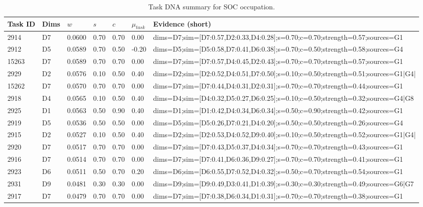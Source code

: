 \begin{table}[htbp]
\centering
\caption{Task DNA summary for SOC occupation.}
\label{tab:appendix_taskdna}
\begin{tabular}{@{}lllllll@{}}
\toprule
Task ID & Dims & $w$ & $s$ & $c$ & $\mu_{task}$ & Evidence (short) \\
\midrule
2914 & D7 & 0.0600 & 0.70 & 0.70 & 0.00 & dims=D7;sim=[D7:0.57,D2:0.33,D4:0.28];s=0.70;c=0.70;strength=0.57;sources=G1 \\
2912 & D5 & 0.0589 & 0.70 & 0.50 & -0.20 & dims=D5;sim=[D5:0.58,D7:0.41,D6:0.38];s=0.70;c=0.50;strength=0.58;sources=G4 \\
15263 & D7 & 0.0589 & 0.70 & 0.70 & 0.00 & dims=D7;sim=[D7:0.57,D4:0.45,D2:0.43];s=0.70;c=0.70;strength=0.57;sources=G1 \\
2929 & D2 & 0.0576 & 0.10 & 0.50 & 0.40 & dims=D2;sim=[D2:0.52,D4:0.51,D7:0.50];s=0.10;c=0.50;strength=0.51;sources=G1|G4| \\
15262 & D7 & 0.0570 & 0.70 & 0.70 & 0.00 & dims=D7;sim=[D7:0.44,D4:0.31,D2:0.31];s=0.70;c=0.70;strength=0.44;sources=G1 \\
2918 & D4 & 0.0565 & 0.10 & 0.50 & 0.40 & dims=D4;sim=[D4:0.32,D5:0.27,D6:0.25];s=0.10;c=0.50;strength=0.32;sources=G4|G8 \\
2925 & D1 & 0.0563 & 0.50 & 0.90 & 0.40 & dims=D1;sim=[D1:0.42,D4:0.34,D6:0.34];s=0.50;c=0.90;strength=0.42;sources=G1 \\
2919 & D5 & 0.0536 & 0.50 & 0.50 & 0.00 & dims=D5;sim=[D5:0.26,D7:0.21,D4:0.20];s=0.50;c=0.50;strength=0.26;sources=G4 \\
2915 & D2 & 0.0527 & 0.10 & 0.50 & 0.40 & dims=D2;sim=[D2:0.53,D4:0.52,D9:0.40];s=0.10;c=0.50;strength=0.52;sources=G1|G4| \\
2920 & D7 & 0.0517 & 0.70 & 0.70 & 0.00 & dims=D7;sim=[D7:0.43,D5:0.37,D4:0.34];s=0.70;c=0.70;strength=0.43;sources=G1 \\
2916 & D7 & 0.0514 & 0.70 & 0.70 & 0.00 & dims=D7;sim=[D7:0.41,D6:0.36,D9:0.27];s=0.70;c=0.70;strength=0.41;sources=G1 \\
2923 & D6 & 0.0511 & 0.50 & 0.70 & 0.20 & dims=D6;sim=[D6:0.55,D7:0.52,D4:0.32];s=0.50;c=0.70;strength=0.54;sources=G1 \\
2931 & D9 & 0.0481 & 0.30 & 0.30 & 0.00 & dims=D9;sim=[D9:0.49,D3:0.41,D1:0.39];s=0.30;c=0.30;strength=0.49;sources=G6|G7 \\
2917 & D7 & 0.0479 & 0.70 & 0.70 & 0.00 & dims=D7;sim=[D7:0.38,D6:0.34,D1:0.31];s=0.70;c=0.70;strength=0.38;sources=G1 \\

\end{tabular}
\end{table}
